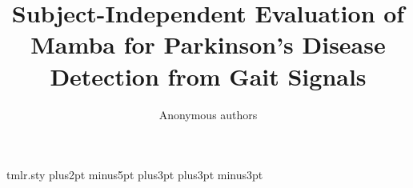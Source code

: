 \begin{filecontents*}{tmlr.sty}
\abovedisplayskip 7pt plus2pt minus5pt%
\belowdisplayskip \abovedisplayskip
\abovedisplayshortskip  0pt plus3pt%
\belowdisplayshortskip  4pt plus3pt minus3pt%


\def\toptitlebar{\hrule height4pt\vskip .25in\vskip-\parskip}

\def\bottomtitlebar{\vskip .29in\vskip-\parskip\hrule height1pt\vskip
.09in} %
\end{filecontents*}

\documentclass[10pt]{article}
\usepackage{tmlr}
\usepackage{amsmath,amssymb,booktabs,graphicx,array,tabularx}
\usepackage{etoolbox}
\usepackage{xurl}
\usepackage[hidelinks]{hyperref}
\graphicspath{{figures/}}
\newcommand{\doi}[1]{\href{https://doi.org/#1}{doi:\nolinkurl{#1}}.}

\newcommand{\AnonymousCodeURL}{}
\newcommand{\AnonymousCodeLink}{%
  \ifdefempty{\AnonymousCodeURL}
    {\textbf{[Anonymous repository URL to be inserted before submission]}}%
    {\expandafter\url\expandafter{\AnonymousCodeURL}}}

\title{Subject-Independent Evaluation of Mamba for Parkinson's Disease Detection from Gait Signals}
\author{\name Anonymous authors}


\maketitle

